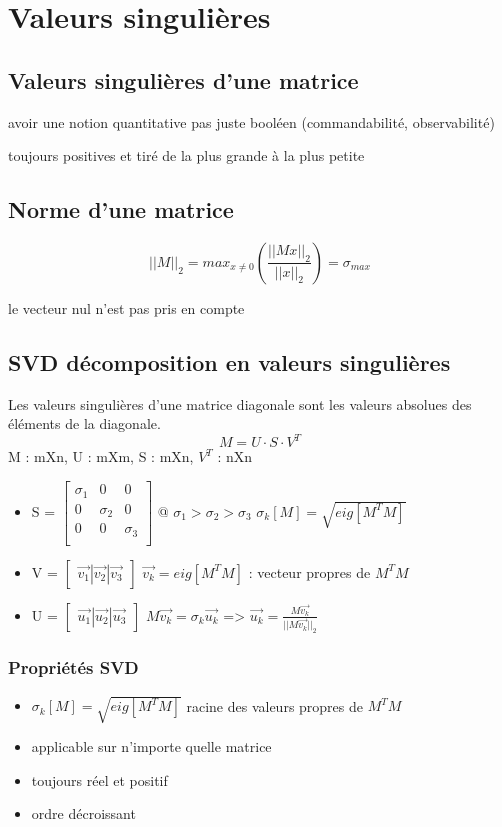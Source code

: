 \documentclass[resume]{subfiles}
\begin{document}
\section{Valeurs singulières}
\subsection{Valeurs singulières d'une matrice}

avoir une notion quantitative pas juste booléen (commandabilité, observabilité)

toujours positives et tiré de la plus grande à la plus petite

\subsection{Norme d'une matrice}
$$||M||_2 = max_{x\neq0}(\frac{||Mx||_2}{||x||_2}) = \sigma_{max}$$

le vecteur nul n'est pas pris en compte

\subsection{SVD décomposition en valeurs singulières}
Les valeurs singulières d'une matrice diagonale sont les valeurs absolues des éléments de la diagonale.
$$M = U\cdot S\cdot V^T$$
M : mXn, U : mXm, S : mXn, $V^T$ : nXn

\begin{itemize}
\item S = $\begin{bmatrix}\sigma_1 & 0& 0\\0&\sigma_2 & 0\\0&0&\sigma_3\\\end{bmatrix}$ @ $\sigma_1 > \sigma_2 > \sigma_3$ 
  \subitem $\sigma_k[M] = \sqrt{eig[M^TM]}$ 
\item V = $\begin{bmatrix}\vec{v_1}|\vec{v_2}|\vec{v_3}\end{bmatrix}$ 
  \subitem $\vec{v_k}= eig[M^TM]$ : vecteur propres de $M^T M$ 
\item U = $\begin{bmatrix}\vec{u_1}|\vec{u_2}|\vec{u_3}\end{bmatrix}$ 
  \subitem $M\vec{v_k} = \sigma_k\vec{u_k}$ => $\vec{u_k}=\frac{M\vec{v_k}}{||M\vec{v_k}||_2}$  
\end{itemize}

\subsubsection{Propriétés SVD}
\begin{itemize}
\item $\sigma_k[M] = \sqrt{eig[M^TM]}$ racine des valeurs propres de $M^TM$ 
\item applicable sur n'importe quelle matrice
\item toujours réel et positif
\item ordre décroissant
\end{itemize}
\end{document}
